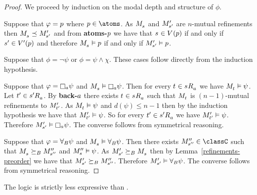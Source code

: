 \begin{proof}
We proceed by induction on the modal depth and structure of $\phi$.

Suppose that $\varphi = p$ where $\atomP \in \atoms$. 
As $\kPModel{\kStateS}$ and ${M^{\prime}_{{s}^{\prime}}}$ are $n$-mutual refinements then $\kPModel{\kStateS} \refines \kPModelP{\kStateSP}$ and from {\bf atoms-$p$} we have that $\kStateS \in \kValuation(\atomP)$ if and only if ${s}^{\prime} \in {V^{\prime}}(p)$ and therefore $\kPModel{\kStateS} \entails \atomP$ if and only if ${M^{\prime}_{{s}^{\prime}}} \vDash p$.

Suppose that $\phi = \neg \psi$ or $\phi = \psi \land \chi$.
These cases follow directly from the induction hypothesis.

Suppose that $\phi = \necessaryA \psi$ and $\kPModel{\kStateS} \entails \necessaryA \psi$.
Then for every $\kStateT \in \kStateS \kAccessibility{\agentA}$ we have $\kPModel{\kStateT} \entails \psi$.
Let $\kStateTP \in \kStateSP \kAccessibility{\agentA}$.
By {\bf back-$a$} there exists $\kStateT \in \kStateS \kAccessibility{\agentA}$ such that $\kPModel{\kStateT}$ is $(n-1)$-mutual refinements to ${M^{\prime}_{{t}^{\prime}}}$.
As $\kPModel{\kStateT} \entails \psi$ and $d(\psi) \leq n - 1$ then by the induction hypothesis we have that ${M^{\prime}_{{t}^{\prime}}} \vDash \psi$.
So for every $\kStateTP \in \kSuccessorsA{\kStateSP}$ we have ${M^{\prime}_{{t}^{\prime}}} \vDash \psi$.
Therefore $\kPModelP{\kStateSP} \entails \necessaryA \psi$.
The converse follows from symmetrical reasoning.

Suppose that $\varphi = {\forall_{B}} \psi$ and $\kPModel{\kStateS} \entails \allrefsBs \psi$.
Then there exists $\kPModelPP{\kStateSPP} \in \classC$ such that $\kPModel{\kStateS} \simulatesBs \kPModelPP{\kStateSPP}$ and $\kPModelPP{\kStateS} \entails \psi$.
As $\kPModelP{\kStateSP} \simulatesBs \kPModel{\kStateS}$ then by Lemma~\ref{refinements-preorder} we have that ${M^{\prime}_{{s}^{\prime}}} \succeq_{B} {M^{\prime\prime}_{{s}^{\prime\prime}}}$.
Therefore ${M^{\prime}_{{s}^{\prime}}} \vDash {\forall_{B}} \psi$.
The converse follows from symmetrical reasoning.
\end{proof}

\begin{theorem}
The logic \logicRmlKF{} is strictly less expressive than \logicTangleKF{}.
\end{theorem}


